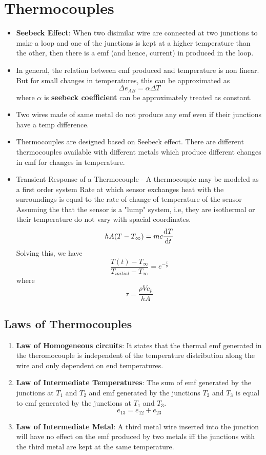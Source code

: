 \documentclass{article}
\begin{document}
\section{Thermocouples}
	\begin{itemize}
		\item \textbf{Seebeck Effect}: When two disimilar wire are connected at two junctions to make a loop and one of the junctions is kept at a higher temperature than the other, then there is a emf (and hence, current) in produced in the loop. 
		\item In general, the relation between emf produced and temperature is non linear. But for small changes in temperatures, this can be approximated as 
		\[\Delta e_{AB} = \alpha \Delta T\] 
		where $\alpha$ is \textbf{seebeck coefficient} can be approximately treated as constant. 
		\item Two wires made of same metal do not produce any emf even if their junctions have a temp difference.
		\item Thermocouples are designed based on Seebeck effect. There are different thermocouples available with different metals which produce different changes in emf for changes in temperature.
		\item Transient Response of a Thermocouple
			- A thermocouple may be modeled as a first order system 
			Rate at which sensor exchanges heat with the surroundings is equal to the rate of change of temperature of the sensor
			Assuming the that the sensor is a "lump" system, i.e, they are isothermal or their temperature do not vary with spacial coordinates.
			\[hA(T-T_\infty) = mc \dv{T}{t}\]
			Solving this, we have 
			\[\frac{T(t) - T_\infty}{T_{initial}- T_\infty} = e^{-\frac{t}{\tau}}\]
			where 
			\[\tau= \frac{\rho V c_p}{hA}\]
	\end{itemize}


	\subsection{Laws of Thermocouples}
	\begin{enumerate}
		\item \textbf{Law of Homogeneous circuits}: It states that the thermal emf generated in the theromocouple is independent of the temperature distribution along the wire and only dependent on end temperatures. 

		\item \textbf{Law of Intermediate Temperatures}: The sum of emf generated by the junctions at $T_1$ and $T_2$ and emf generated by the junctions $T_2$ and $T_3$ is equal to emf generated by the junctions at $T_1$ and $T_3$. 
		\[e_{13} = e_{12} + e_{23}\]

		\item \textbf{Law of Intermediate Metal}: A third metal wire inserted into the junction will have no effect on the emf produced by two metals iff the junctions with the third metal are kept at the same temperature.
	\end{enumerate}
\end{document}
